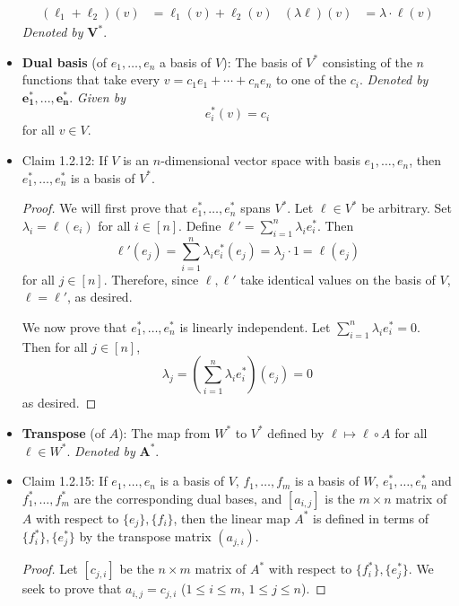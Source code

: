 \documentclass[../notes.tex]{subfiles}
\begin{document}
\begin{itemize}
\begin{align*}
        (\ell_1+\ell_2)(v) &= \ell_1(v)+\ell_2(v)&
        (\lambda\ell)(v) &= \lambda\cdot\ell(v)
    \end{align*}
    \emph{Denoted by} $\bm{V^*}$.
    \item \textbf{Dual basis} (of $e_1,\dots,e_n$ a basis of $V$): The basis of $V^*$ consisting of the $n$ functions that take every $v=c_1e_1+\cdots+c_ne_n$ to one of the $c_i$. \emph{Denoted by} $\bm{e_1^*,...,e_n^*}$. \emph{Given by}
    \begin{equation*}
        e_i^*(v) = c_i
    \end{equation*}
    for all $v\in V$.
    \item Claim 1.2.12: If $V$ is an $n$-dimensional vector space with basis $e_1,\dots,e_n$, then $e_1^*,\dots,e_n^*$ is a basis of $V^*$.
    \begin{proof}
        We will first prove that $e_1^*,\dots,e_n^*$ spans $V^*$. Let $\ell\in V^*$ be arbitrary. Set $\lambda_i=\ell(e_i)$ for all $i\in[n]$. Define $\ell'=\sum_{i=1}^n\lambda_ie_i^*$. Then
        \begin{equation*}
            \ell'(e_j) = \sum_{i=1}^n\lambda_ie_i^*(e_j)
            = \lambda_j\cdot 1
            = \ell(e_j)
        \end{equation*}
        for all $j\in[n]$. Therefore, since $\ell,\ell'$ take identical values on the basis of $V$, $\ell=\ell'$, as desired.\par
        We now prove that $e_1^*,\dots,e_n^*$ is linearly independent. Let $\sum_{i=1}^n\lambda_ie_i^*=0$. Then for all $j\in[n]$,
        \begin{equation*}
            \lambda_j = \left( \sum_{i=1}^n\lambda_ie_i^* \right)(e_j)
            = 0
        \end{equation*}
        as desired.
    \end{proof}
    \item \textbf{Transpose} (of $A$): The map from $W^*$ to $V^*$ defined by $\ell\mapsto\ell\circ A$ for all $\ell\in W^*$. \emph{Denoted by} $\bm{A^*}$.
    \item Claim 1.2.15: If $e_1,\dots,e_n$ is a basis of $V$, $f_1,\dots,f_m$ is a basis of $W$, $e_1^*,\dots,e_n^*$ and $f_1^*,\dots,f_m^*$ are the corresponding dual bases, and $[a_{i,j}]$ is the $m\times n$ matrix of $A$ with respect to $\{e_j\},\{f_i\}$, then the linear map $A^*$ is defined in terms of $\{f_i^*\},\{e_j^*\}$ by the transpose matrix $(a_{j,i})$.
    \begin{proof}
        Let $[c_{j,i}]$ be the $n\times m$ matrix of $A^*$ with respect to $\{f_i^*\},\{e_j^*\}$. We seek to prove that $a_{i,j}=c_{j,i}$ ($1\leq i\leq m$, $1\leq j\leq n$).\par

\end{proof}
\end{itemize}
\end{document}
